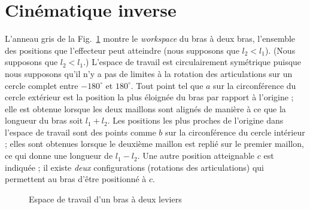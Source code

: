 \section{Cinématique inverse}\label{s.inverse-kinematics}

L'anneau gris de la Fig.~\ref{fig.workspace} montre le \emph{workspace} du bras à deux bras, l'ensemble des positions que l'effecteur peut atteindre (nous supposons que $l_2<l_1$). (Nous supposons que $l_2<l_1$.) L'espace de travail est circulairement symétrique puisque nous supposons qu'il n'y a pas de limites à la rotation des articulations sur un cercle complet entre $-180^{\circ}$ et $180^{\circ}$. Tout point tel que $a$ sur la circonférence du cercle extérieur est la position la plus éloignée du bras par rapport à l'origine ; elle est obtenue lorsque les deux maillons sont alignés de manière à ce que la longueur du bras soit $l_1+l_2$. Les positions les plus proches de l'origine dans l'espace de travail sont des points comme $b$ sur la circonférence du cercle intérieur ; elles sont obtenues lorsque le deuxième maillon est replié sur le premier maillon, ce qui donne une longueur de $l_1-l_2$. Une autre position atteignable $c$ est indiquée ; il existe \emph{deux} configurations (rotations des articulations) qui permettent au bras d'être positionné à $c$.

\begin{figure}
\begin{center}
\end{center}
\caption{Espace de travail d'un bras à deux leviers}\label{fig.workspace}
\end{figure}

